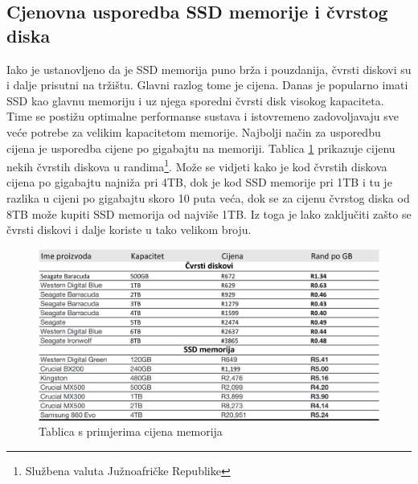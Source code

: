 \documentclass[times, utf8, zavrsni, square]{fer}
\begin{document}
\subsection{Cjenovna usporedba SSD memorije i čvrstog diska}
Iako je ustanovljeno da je SSD memorija puno brža i pouzdanija, čvrsti diskovi su i dalje prisutni na tržištu.
Glavni razlog tome je cijena. Danas je popularno imati SSD kao glavnu memoriju i uz njega sporedni čvrsti disk visokog kapaciteta.
Time se postižu optimalne performanse sustava i istovremeno zadovoljavaju sve veće potrebe za velikim kapacitetom memorije.
Najbolji način za usporedbu cijena je usporedba cijene po gigabajtu na memoriji. 
Tablica \ref{fig:prices} prikazuje cijenu nekih čvrstih diskova u randima\footnote{Službena valuta Južnoafričke Republike}.
Može se vidjeti kako je kod čvrstih diskova cijena po gigabajtu najniža pri 4TB, dok je kod SSD memorije pri 1TB i tu je razlika u cijeni po gigabajtu skoro 10 puta veća\cite{prices}, dok se za cijenu čvrstog diska od 8TB može kupiti SSD memorija od najviše 1TB.
Iz toga je lako zaključiti zašto se čvrsti diskovi i dalje koriste u tako velikom broju.
\begin{figure}[h!]
    \centering
    \includegraphics[width=1\textwidth]{memory_prices}
    \caption{Tablica s primjerima cijena memorija}
    \label{fig:prices}
\end{figure} 
\FloatBarrier
\end{document}
